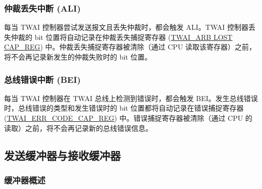 \documentclass[main\_\_CN.tex]{subfiles}
\begin{document}
\subsubsection{仲裁丢失中断 (ALI)}
每当 TWAI 控制器尝试发送报文且丢失仲裁时，都会触发 ALI。TWAI 控制器丢失仲裁的 bit 位置将自动记录在仲裁丢失捕捉寄存器 (\hyperref[regdesc:TWAIARB LOST CAPREG]{TWAI\_ARB LOST CAP\_REG}) 中。仲裁丢失捕捉寄存器被清除（通过 CPU 读取该寄存器）之前，将不会再记录新发生的仲裁失败时的 bit 位置。

\subsubsection{总线错误中断 (BEI)}
每当 TWAI 控制器在 TWAI 总线上检测到错误时，都会触发 BEI。发生总线错误时，总线错误的类型和发生错误时的 bit 位置都将自动记录在错误捕捉寄存器 (\hyperref[regdesc:TWAIERRCODECAPREG]{TWAI\_ERR\_CODE\_CAP\_REG}) 中。错误捕捉寄存器被清除（通过 CPU 的读取）之前，将不会再记录新的总线错误信息。

\subsection{发送缓冲器与接收缓冲器}
\subsubsection{缓冲器概述}
\end{document}
